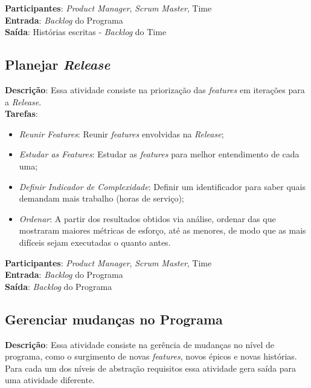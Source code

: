   \textbf{Participantes}: \textit{Product Manager}, \textit{Scrum Master}, Time\\

  \textbf{Entrada}: \textit{Backlog} do Programa \\

  \textbf{Saída}:   Histórias escritas - \textit{Backlog} do Time \\

\subsection{Planejar \textit{Release}}
  \textbf{Descrição}: Essa atividade consiste na priorização das \textit{features} em iterações para a \textit{Release}. \\

  \textbf{Tarefas}:
  \begin{itemize}
   \item \indent \textit{Reunir \textit{Features}}: Reunir \textit{features} envolvidas na \textit{Release};

   \item \indent \textit{Estudar as \textit{Features}}: Estudar as \textit{features} para melhor entendimento de cada uma;

   \item \indent \textit{Definir Indicador de Complexidade}: Definir um identificador para saber quais demandam mais trabalho (horas de serviço);

   \item \indent \textit{Ordenar}: A partir dos resultados obtidos via análise, ordenar das que mostraram maiores métricas de esforço, até as menores, de modo que as mais difíceis sejam executadas o quanto antes.
  \end{itemize}

  \textbf{Participantes}: \textit{Product Manager}, \textit{Scrum Master}, Time\\

  \textbf{Entrada}: \textit{Backlog} do Programa \\

  \textbf{Saída}:  \textit{Backlog} do Programa \\

\subsection{Gerenciar mudanças no Programa}
  \textbf{Descrição}: Essa atividade consiste na gerência de mudanças no nível de programa, como o surgimento de novas 
  \textit{features}, novos épicos e novas histórias. Para cada um dos níveis de abstração requisitos essa atividade gera saída
  para uma atividade diferente.\\


